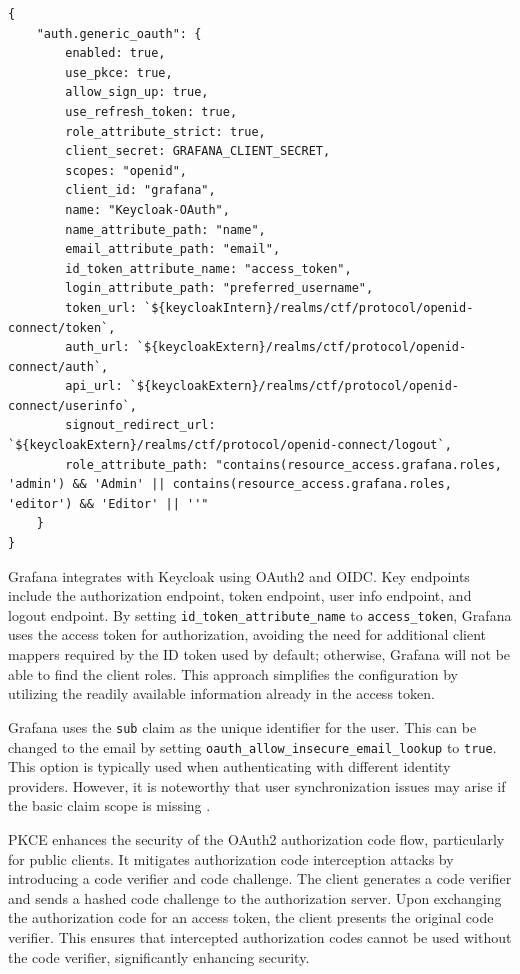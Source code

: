 \begin{verbatim}
{
    "auth.generic_oauth": {
        enabled: true,
        use_pkce: true,
        allow_sign_up: true,
        use_refresh_token: true,
        role_attribute_strict: true,
        client_secret: GRAFANA_CLIENT_SECRET,
        scopes: "openid",
        client_id: "grafana",
        name: "Keycloak-OAuth",
        name_attribute_path: "name",
        email_attribute_path: "email",
        id_token_attribute_name: "access_token",
        login_attribute_path: "preferred_username",
        token_url: `${keycloakIntern}/realms/ctf/protocol/openid-connect/token`,
        auth_url: `${keycloakExtern}/realms/ctf/protocol/openid-connect/auth`,
        api_url: `${keycloakExtern}/realms/ctf/protocol/openid-connect/userinfo`,
        signout_redirect_url: `${keycloakExtern}/realms/ctf/protocol/openid-connect/logout`,
        role_attribute_path: "contains(resource_access.grafana.roles, 'admin') && 'Admin' || contains(resource_access.grafana.roles, 'editor') && 'Editor' || ''"
    }
}
\end{verbatim}

Grafana integrates with Keycloak using OAuth2 and OIDC. Key endpoints include the authorization endpoint, token endpoint, user info endpoint, and logout endpoint. By setting \texttt{id\_token\_attribute\_name} to \texttt{access\_token}, Grafana uses the access token for authorization, avoiding the need for additional client mappers required by the ID token used by default; otherwise, Grafana will not be able to find the client roles. This approach simplifies the configuration by utilizing the readily available information already in the access token.

Grafana uses the \texttt{sub} claim as the unique identifier for the user. This can be changed to the email by setting \texttt{oauth\_allow\_insecure\_email\_lookup} to \texttt{true}. This option is typically used when authenticating with different identity providers. However, it is noteworthy that user synchronization issues may arise if the basic claim scope is missing \parencite{grafana_authentication}.

PKCE enhances the security of the OAuth2 authorization code flow, particularly for public clients. It mitigates authorization code interception attacks by introducing a code verifier and code challenge. The client generates a code verifier and sends a hashed code challenge to the authorization server. Upon exchanging the authorization code for an access token, the client presents the original code verifier. This ensures that intercepted authorization codes cannot be used without the code verifier, significantly enhancing security.

